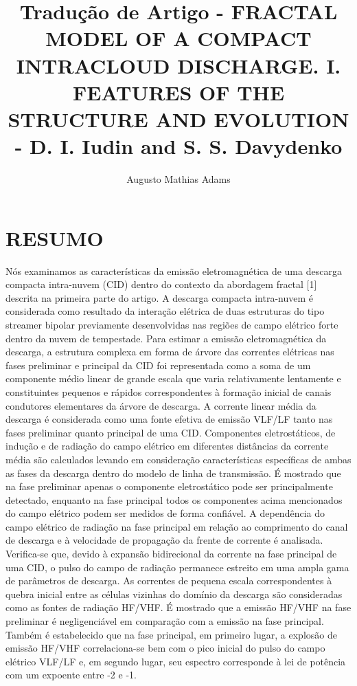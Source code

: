 \documentclass[a4paper, 12pt, onecolumn,singlespacing]{article}
\title{Tradução de Artigo - FRACTAL MODEL OF A COMPACT INTRACLOUD DISCHARGE. I. FEATURES OF THE STRUCTURE AND EVOLUTION - D. I. Iudin and S. S. Davydenko}
\author[1]{Augusto Mathias Adams}
\affil[1]{augusto.adams@ufpr.br}
\begin{document}
	
	\maketitle

	\section{RESUMO}
	
	Nós examinamos as características da emissão eletromagnética de uma descarga compacta intra-nuvem (CID) dentro do contexto da abordagem fractal [1] descrita na primeira parte do artigo. A descarga compacta intra-nuvem é considerada como resultado da interação elétrica de duas estruturas do tipo streamer bipolar previamente desenvolvidas nas regiões de campo elétrico forte dentro da nuvem de tempestade. Para estimar a emissão eletromagnética da descarga, a estrutura complexa em forma de árvore das correntes elétricas nas fases preliminar e principal da CID foi representada como a soma de um componente médio linear de grande escala que varia relativamente lentamente e constituintes pequenos e rápidos correspondentes à formação inicial de canais condutores elementares da árvore de descarga. A corrente linear média da descarga é considerada como uma fonte efetiva de emissão VLF/LF tanto nas fases preliminar quanto principal de uma CID. Componentes eletrostáticos, de indução e de radiação do campo elétrico em diferentes distâncias da corrente média são calculados levando em consideração características específicas de ambas as fases da descarga dentro do modelo de linha de transmissão. É mostrado que na fase preliminar apenas o componente eletrostático pode ser principalmente detectado, enquanto na fase principal todos os componentes acima mencionados do campo elétrico podem ser medidos de forma confiável. A dependência do campo elétrico de radiação na fase principal em relação ao comprimento do canal de descarga e à velocidade de propagação da frente de corrente é analisada. Verifica-se que, devido à expansão bidirecional da corrente na fase principal de uma CID, o pulso do campo de radiação permanece estreito em uma ampla gama de parâmetros de descarga. As correntes de pequena escala correspondentes à quebra inicial entre as células vizinhas do domínio da descarga são consideradas como as fontes de radiação HF/VHF. É mostrado que a emissão HF/VHF na fase preliminar é negligenciável em comparação com a emissão na fase principal. Também é estabelecido que na fase principal, em primeiro lugar, a explosão de emissão HF/VHF correlaciona-se bem com o pico inicial do pulso do campo elétrico VLF/LF e, em segundo lugar, seu espectro corresponde à lei de potência com um expoente entre -2 e -1.
	
\end{document}
